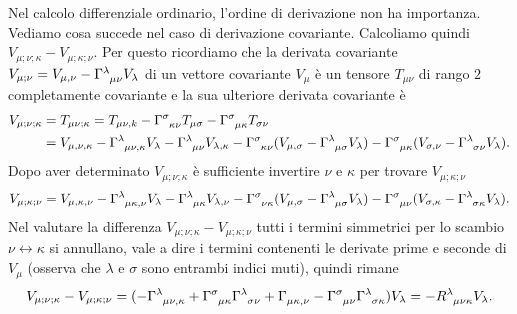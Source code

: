 Nel calcolo differenziale ordinario, l'ordine di derivazione non ha importanza.
Vediamo cosa succede nel caso di derivazione covariante.  Calcoliamo quindi
$V_{\mu;\nu;\kappa} - V_{\mu;\kappa;\nu}$.  Per questo ricordiamo che la
derivata covariante $V_{\mu;\nu} = V_{\mu,\nu} -
\tensor{\Gamma}{^{\lambda}_{\mu\nu}} V_{\lambda}$ di un vettore covariante
$V_{\mu}$ è un tensore $T_{\mu\nu}$ di rango $2$ completamente covariante e la
sua ulteriore derivata covariante è
\begin{equation}
  \begin{split}
    V_{\mu;\nu;\kappa} &= T_{\mu\nu;\kappa} = T_{\mu\nu,k} -
    \tensor{\Gamma}{^{\sigma}_{\kappa\nu}} T_{\mu\sigma} -
    \tensor{\Gamma}{^{\sigma}_{\mu\kappa}} T_{\sigma\nu} \\
    &= V_{\mu,\nu,\kappa} -
    \tensor{\Gamma}{^{\lambda}_{\mu\nu,\kappa}}V_{\lambda} -
    \tensor{\Gamma}{^{\lambda}_{\mu\nu}} V_{\lambda,\kappa} -
    \tensor{\Gamma}{^{\sigma}_{\kappa\nu}} (V_{\mu,\sigma} -
    \tensor{\Gamma}{^{\lambda}_{\mu\sigma}} V_{\lambda}) -
    \tensor{\Gamma}{^{\sigma}_{\mu\kappa}} (V_{\sigma,\nu} -
    \tensor{\Gamma}{^{\lambda}_{\sigma\nu}} V_{\lambda}).
  \end{split}
\end{equation}
Dopo aver determinato $V_{\mu;\nu;\kappa}$ è sufficiente invertire $\nu$ e
$\kappa$ per trovare $V_{\mu;\kappa;\nu}$
\begin{equation}
  V_{\mu;\kappa;\nu} = V_{\mu,\kappa,\nu} -
    \tensor{\Gamma}{^{\lambda}_{\mu\kappa,\nu}}V_{\lambda} -
    \tensor{\Gamma}{^{\lambda}_{\mu\kappa}} V_{\lambda,\nu} -
    \tensor{\Gamma}{^{\sigma}_{\nu\kappa}} (V_{\mu,\sigma} -
    \tensor{\Gamma}{^{\lambda}_{\mu\sigma}} V_{\lambda}) -
    \tensor{\Gamma}{^{\sigma}_{\mu\nu}} (V_{\sigma,\kappa} -
    \tensor{\Gamma}{^{\lambda}_{\sigma\kappa}} V_{\lambda}).
\end{equation}
Nel valutare la differenza $V_{\mu;\nu;\kappa} - V_{\mu;\kappa;\nu}$ tutti i
termini simmetrici per lo scambio $\nu \leftrightarrow \kappa$ si annullano,
vale a dire i termini contenenti le derivate prime e seconde di $V_{\mu}$
(osserva che $\lambda$ e $\sigma$ sono entrambi indici muti), quindi rimane
\begin{equation}
  V_{\mu;\nu;\kappa} - V_{\mu;\kappa;\nu} =
  (-\tensor{\Gamma}{^{\lambda}_{\mu\nu,\kappa}} +
  \tensor{\Gamma}{^{\sigma}_{\mu\kappa}} \tensor{\Gamma}{^{\lambda}_{\sigma\nu}}
  + \tensor{\Gamma}{_{\mu\kappa,\nu}} - \tensor{\Gamma}{^{\sigma}_{\mu\nu}}
  \tensor{\Gamma}{^{\lambda}_{\sigma\kappa}}) V_{\lambda} =
  -\tensor{R}{^{\lambda}_{\mu\nu\kappa}} V_{\lambda}.
\end{equation}
